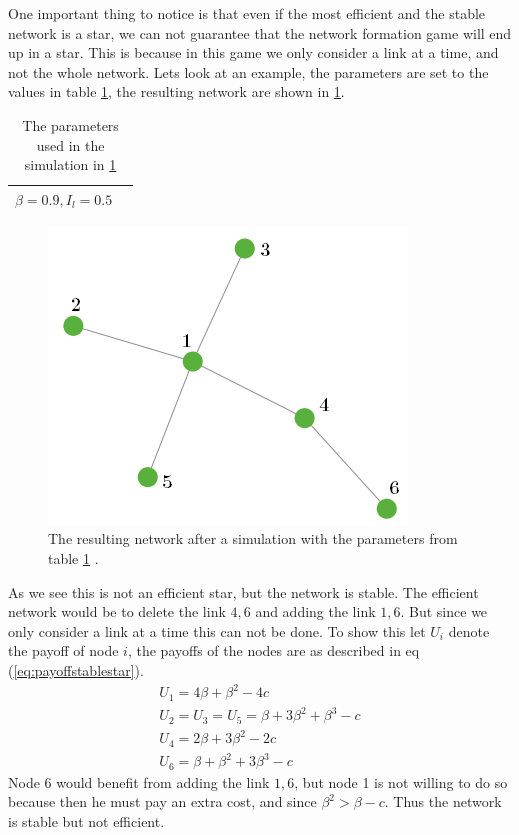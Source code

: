 One important thing to notice is that even if the most efficient and the stable network is a star, we can not guarantee that the network formation game will end up in a star. This is because in this game we only consider a link at a time, and not the whole network.
Lets look at an example, the parameters are set to the values in table \ref{tbl:stablestar}, the resulting network are shown in \ref{fig:stablestar}.
\begin{table}[h]
\centering
\begin{tabular}{lc}
 \hline
  $
  \beta=0.9,
  I_{l}=0.5$\\
  \hline
\end{tabular}
\caption{The parameters used in the simulation in \ref{fig:stablestar} \label{tbl:stablestar}}
\end{table}
\begin{figure}[h]
\centering
  \includegraphics[width=0.5\linewidth]{../Figures/stability/Unefficientbutstablestar.png}
  \caption{\label{fig:stablestar} The resulting network after a simulation with the parameters from table \ref{tbl:stablestar} .}
\end{figure}
As we see this is not an efficient star, but the network is stable. The efficient network would be to delete the link $4,6$ and adding the link $1,6$. But since we only consider a link at a time this can not be done. To show this let $U_{i}$ denote the payoff of node $i$, the payoffs of the nodes are as described in eq (\ref{eq:payoffstablestar}).
\begin{eqnarray}
U_{1}=4\beta+\beta^2-4c\\
U_{2}=U_{3}=U_{5}=\beta+3\beta^2+\beta^3-c\\
U_{4}=2\beta+3\beta^2-2c\\
U_{6}=\beta+\beta^2+3\beta^3-c
\label{eq:payoffstablestar}
\end{eqnarray}
Node $6$ would benefit from adding the link $1,6$, but node 1 is not willing to do so because then he must pay an extra cost, and since $\beta^2>\beta-c$. Thus the network is stable but not efficient. 

